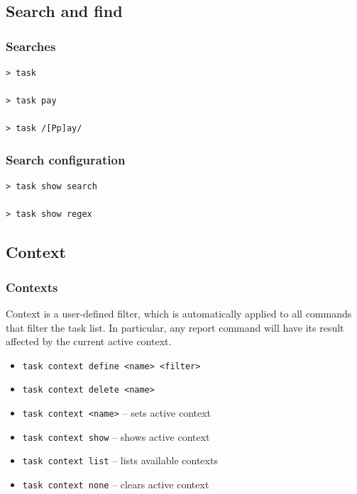 \documentclass[t,handout,aspectratio=169]{beamer}
\begin{document}
\subsection{Search and find}

\begin{frame}[fragile]\frametitle{Searches}
    \vfill
    \begin{lstlisting}
> task

> task pay

> task /[Pp]ay/\end{lstlisting}
\end{frame}

\begin{frame}[fragile]\frametitle{Search configuration}
    \vfill
    \begin{lstlisting}
> task show search

> task show regex\end{lstlisting}
\end{frame}

\subsection{Context}

\begin{frame}[fragile]\frametitle{Contexts}
    \vfill
       Context is a user-defined filter, which is automatically applied to all commands that filter the task list. In particular, any report command will have its result affected by the current active context. \pause

    \begin{itemize}
        \item \verb+task context define <name> <filter>+
        \item \verb+task context delete <name>+
        \item \verb+task context <name>+ -- sets active context
        \item \verb+task context show+ -- shows active context
        \item \verb+task context list+ -- lists available contexts
        \item \verb+task context none+ -- clears active context
    \end{itemize}
\end{frame}

\end{document}
